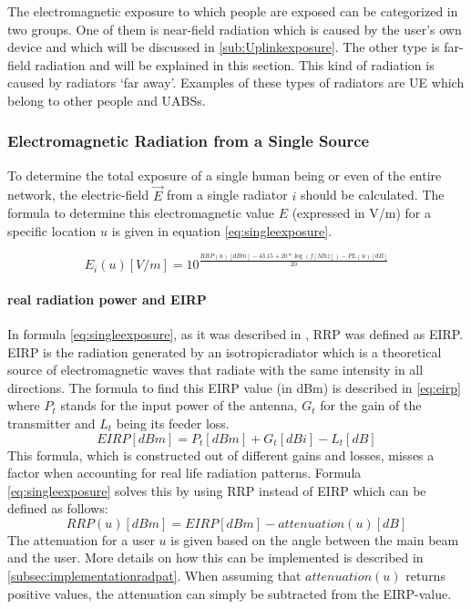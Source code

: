 The electromagnetic exposure to which people are exposed can be categorized in two groups. One of them is near-field radiation which is caused 
by the user's own device and which will be discussed in \ref{sub:Uplinkexposure}.
The other type is far-field radiation and will be explained in this section. This kind of radiation is caused by radiators `far away'.
Examples of these types of radiators are \gls{UE} which belong to other people and \gls{UABS}s. 

\subsubsection{Electromagnetic Radiation from a Single Source}
\label{sec:calculatingexposure}

To determine the total exposure of a single human being or even of the entire network, the electric-field $\vec{E}$ from a single radiator $i$ should be calculated.
The formula to determine this electromagnetic value $E$ (expressed in V/m) for a specific location $u$ is given in equation \ref{eq:singleexposure}.

\begin{equation}
E_i(u) [V/m] = 10^{\frac{RRP(u)[dBm] - 43.15 + 20*\log(f [Mhz])- PL(u) [dB]}{20}}
\label{eq:singleexposure}
\end{equation}

\paragraph{real radiation power and EIRP}
In formula \ref{eq:singleexposure}, as it was described in \cite{J6_originalExposureFormula, J1}, 
\gls{RRP} was defined as \gls{EIRP}. \gls{EIRP} is the radiation generated by an \gls{isotropicradiator} which is
a theoretical source of electromagnetic waves that radiate with the same intensity in all directions. 
The formula to find this \gls{EIRP} value (in dBm) is described in \ref{eq:eirp}
where $P_t$ stands for the input power of the antenna, $G_t$ for the gain of the transmitter and $L_t$ being its feeder loss.
\begin{equation}
EIRP [dBm] = P_t [dBm] + G_t [dBi]- L_t [dB]
\label{eq:eirp}
\end{equation}
This formula, which is constructed out of different gains and losses, misses a factor when accounting for real life radiation patterns.
Formula \ref{eq:singleexposure} solves this by using \gls{RRP} instead of \gls{EIRP} which can be defined as follows:
\begin{equation}
RRP(u) [dBm] = EIRP [dBm] - attenuation(u) [dB]
\label{eq:rrp}
\end{equation}
The attenuation for a user $u$ is given based on the angle between the main beam and the user. More details on how this can be implemented is described in \ref{subsec:implementationradpat}.
When assuming that $attenuation(u)$ returns positive values, the attenuation can simply be subtracted from the EIRP-value.

